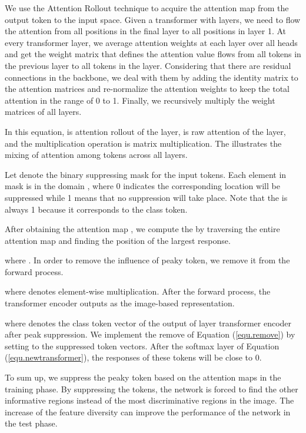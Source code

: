 \documentclass[5p,twocolumn]{elsarticle}
\begin{document}
We use the Attention Rollout technique \cite{Abnar2020Quantifying} to acquire the attention map from the output token to the input space. Given a transformer with  layers, we need to flow the attention from all positions in the final layer  to all positions in layer 1.
At every transformer layer, we average attention weights at each layer over all heads and get the weight matrix  that defines the attention value flows from all tokens in the previous layer to all tokens in the  layer.
Considering that there are residual connections in the backbone, we deal with them by adding the identity matrix  to the attention matrices and re-normalize the attention weights to keep the total attention in the range of 0 to 1. Finally, we recursively multiply the weight matrices of all layers. 

In this equation,  is attention rollout of the  layer,  is raw attention of the  layer, and the multiplication operation is matrix multiplication. The  illustrates the mixing of attention among tokens across all layers. 

Let  denote the binary suppressing mask for the input tokens. Each element in mask  is in the domain , where 0 indicates the corresponding location will be suppressed while 1 means that no suppression will take place. Note that the  is always 1 because it corresponds to the class token. 

After obtaining the attention map , we compute the  by traversing the entire attention map and finding the position of the largest response.

where  . In order to remove the influence of peaky token, we remove it from the forward process. 


where  denotes element-wise multiplication. After the forward process, the transformer encoder outputs  as the image-based representation.

where  denotes the class token vector of the output of  layer transformer encoder after peak suppression.
We implement the remove of Equation (\ref{equ.remove}) by setting  to the suppressed token vectors.
After the softmax layer of Equation (\ref{equ.newtransformer}), the responses of these tokens will be close to 0. 

To sum up, we suppress the peaky token based on the attention maps in the training phase.  By suppressing the tokens, the network is forced to find the other informative regions instead of the most discriminative regions in the image. The increase of the feature diversity can improve the performance of the network in the test phase.
\end{document}
